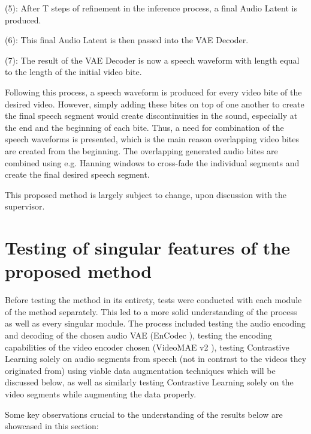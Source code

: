 \documentclass[12pt]{article}
\begin{document}
(5): After T steps of refinement in the inference process, a final Audio Latent is produced.

(6): This final Audio Latent is then passed into the VAE Decoder.

(7): The result of the VAE Decoder is now a speech waveform with length equal to the length of the initial video bite.

Following this process, a speech waveform is produced for every video bite of the desired video. However, simply adding these bites on top of one another to create the final speech segment would create discontinuities in the sound, especially at the end and the beginning of each bite. Thus, a need for combination of the speech waveforms is presented, which is the main reason overlapping video bites are created from the beginning. The overlapping generated audio bites are combined using e.g. Hanning windows to cross-fade the individual segments and create the final desired speech segment.

This proposed method is largely subject to change, upon discussion with the supervisor.

\section{Testing of singular features of the proposed method}

Before testing the method in its entirety, tests were conducted with each module of the method separately. This led to a more solid understanding of the process as well as every singular module. The process included testing the audio encoding and decoding of the chosen audio VAE (EnCodec \cite{EnCodec}), testing the encoding capabilities of the video encoder chosen (VideoMAE v2 \cite{VideoMAEv2}), testing Contrastive Learning solely on audio segments from speech (not in contrast to the videos they originated from) using viable data augmentation techniques which will be discussed below, as well as similarly testing Contrastive Learning solely on the video segments while augmenting the data properly.

Some key observations crucial to the understanding of the results below are showcased in this section:
\end{document}
